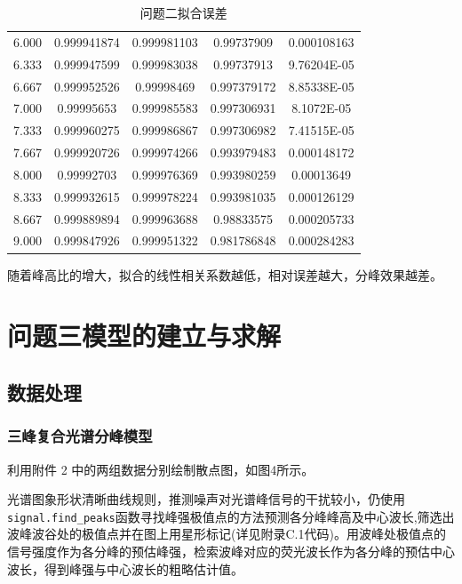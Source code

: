 \documentclass{article}
\numberwithin{equation}{subsection}
\begin{document}
\begin{table}[h]
\begin{tabular}{|c|c|c|c|c|}
        6.000&0.999941874&	0.999981103&	0.99737909&0.000108163\\

        6.333&0.999947599&	0.999983038&	0.99737913&9.76204E-05\\

        6.667&0.999952526&	0.99998469&	0.997379172&8.85338E-05\\

        7.000&0.99995653&	0.999985583&	0.997306931&8.1072E-05\\

        7.333&0.999960275&	0.999986867&	0.997306982&7.41515E-05\\

        7.667&0.999920726&	0.999974266&	0.993979483&0.000148172\\

        8.000&0.99992703&	0.999976369&	0.993980259&0.00013649\\

        8.333&0.999932615&	0.999978224&	0.993981035&0.000126129\\

        8.667&0.999889894&	0.999963688&	0.98833575&0.000205733\\

        9.000&0.999847926&	0.999951322&	0.981786848&0.000284283\\
        \hline
    \end{tabular}
    \caption{问题二拟合误差}
\end{table}

随着峰高比的增大，拟合的线性相关系数越低，相对误差越大，分峰效果越差。
\newpage


{\centering\section{问题三模型的建立与求解}}

\subsection{数据处理}

\subsubsection{三峰复合光谱分峰模型}
利用附件 2 中的两组数据分别绘制散点图，如图4所示。

光谱图象形状清晰曲线规则，推测噪声对光谱峰信号的干扰较小，仍使用\verb|signal.find_peaks|函数寻找峰强极值点的方法预测各分峰峰高及中心波长,筛选出波峰波谷处的极值点并在图上用星形标记(详见附录C.1代码)。用波峰处极值点的信号强度作为各分峰的预估峰强，检索波峰对应的荧光波长作为各分峰的预估中心波长，得到峰强与中心波长的粗略估计值。
\end{document}
